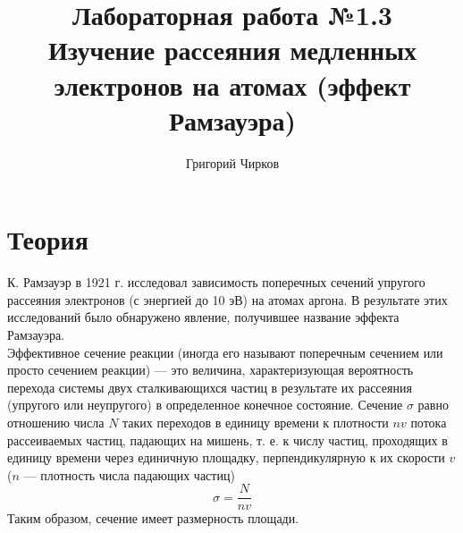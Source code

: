 \documentclass[12pt,a4paper]{article}
\author{Григорий Чирков}
\title{Лабораторная работа №1.3 \\
		 Изучение рассеяния медленных электронов на атомах (эффект Рамзауэра) }
\begin{document}
\maketitle
\section{Теория}
К. Рамзауэр в 1921 г. исследовал зависимость поперечных сечений упругого рассеяния электронов (с энергией до 10 эВ) на атомах аргона. В результате этих исследований было обнаружено явление, получившее название эффекта Рамзауэра. \\

Эффективное сечение реакции (иногда его называют поперечным сече­нием или просто сечением реакции) — это величина, характеризующая вероятность перехода системы двух сталкивающихся частиц в результате их рассеяния (упругого или неупругого) в определенное конечное состояние. Сечение $\sigma$ равно отношению числа $N$ таких переходов в единицу времени к плотности $nv$ потока рассеиваемых частиц, падающих на ми­шень, т. е. к числу частиц, проходящих в единицу времени через единичную пло­щадку, перпендикулярную к их скорости $v$ ($n$ — плотность числа падающих ча­стиц)
\begin{equation}
\sigma = \frac{N}{nv}
\end{equation}
Таким образом, сечение имеет раз­мерность площади. \\
\end{document}
